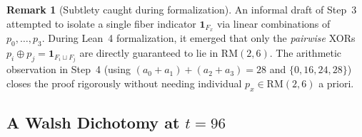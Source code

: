 \documentclass[11pt]{article}
\theoremstyle{definition}
\newtheorem{remark}[theorem]{Remark}
\newcommand{\ind}{\mathbf{1}}
\begin{document}
\begin{remark}[Subtlety caught during formalization]
An informal draft of Step~3 attempted to isolate a single fiber indicator $\ind_{F_x}$ via linear combinations of $p_0, \dots, p_3$. During Lean~4 formalization, it emerged that only the \emph{pairwise} XORs $p_i \oplus p_j = \ind_{F_i \sqcup F_j}$ are directly guaranteed to lie in $\mathrm{RM}(2, 6)$. The arithmetic observation in Step~4 (using $(a_0+a_1)+(a_2+a_3)=28$ and $\{0, 16, 24, 28\}$) closes the proof rigorously without needing individual $p_x \in \mathrm{RM}(2, 6)$ a priori.
\end{remark}

\subsection{A Walsh Dichotomy at $t = 96$}
\end{document}
